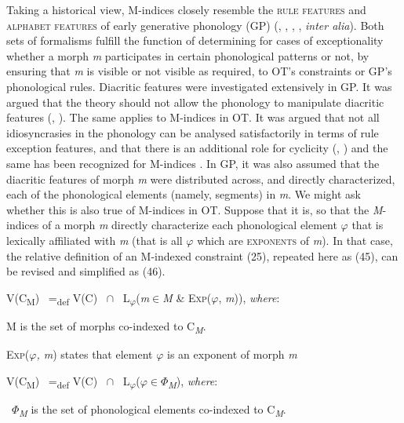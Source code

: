 \documentclass[output=paper,
modfonts
]{LSP/langsci}
\begin{document}
Taking a historical view, M-indices closely resemble the \textsc{rule features} and \textsc{alphabet features} of early generative phonology (GP) (\citealt{chomskyhalle1968}, \citealt{lakoff1970}, \citealt{coats1970}, \citealt{zonneveld1978}, \textit{inter alia}). Both sets of formalisms fulfill the function of determining for cases of exceptionality whether a morph \textit{m} participates in certain phonological patterns or not, by ensuring that \textit{m} is visible or not visible as required, to OT's constraints or GP's phonological rules. Diacritic features were investigated extensively in GP. It was argued that the theory should not allow the phonology to manipulate diacritic features (\citealt{kiparsky1973r}, \citealt{zonneveld1978}). The same applies to M-indices in OT. It was argued that not all idiosyncrasies in the phonology can be analysed satisfactorily in terms of rule exception features, and that there is an additional role for cyclicity (\citealt{chomskyhalle1968}, \citealt{kiparsky1982r}) and the same has been recognized for M-indices \citep{pater2009r}. In GP, it was also assumed that the diacritic features of morph \textit{m} were distributed across, and directly characterized, each of the phonological elements (namely, segments) in \textit{m}. We might ask whether this is also true of M-indices in OT. Suppose that it is, so that the \textit{M}{}-indices of a morph \textit{m} directly characterize each phonological element $\varphi $ that is lexically affiliated with \textit{m} (that is all $\varphi $ which are \textsc{exponents} of \textit{m}). In that case, the relative definition of an M-indexed constraint (25), repeated here as (45), can be revised and simplified as (46). 

\ea
V(\textsc{C}\textsc{\textsubscript{M}}) \ =\textsubscript{def} V(\textsc{C}) \ ${\cap}$ \ L\textsubscript{$\varphi $}(\textit{m}${\in}$\textit{M} \& \textsc{Exp}($\varphi $, \textit{m})), \textit{where}:

\textsc{M}\textsc{} is the set of morphs co-indexed to C\textit{\textsubscript{M}}.

\textsc{Exp}($\varphi $\textit{, m}) states that element $\varphi $\textit{} is an exponent of morph \textit{m}
\z

\ea
V(\textsc{C}\textsc{\textsubscript{M}}) \ =\textsubscript{def} V(\textsc{C)} \ ${\cap}$ \ L\textsubscript{$\varphi $}($\varphi $${\in}$$\Phi $\textit{\textsubscript{M}}), \textit{where}:

\ $\Phi $\textit{\textsubscript{M}} is the set of phonological elements co-indexed to C\textit{\textsubscript{M}}.
\z
\end{document}
